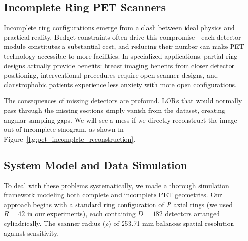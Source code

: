 \documentclass[12pt]{iopart}
\begin{document}
\subsection{Incomplete Ring PET Scanners}



Incomplete ring configurations emerge from a clash between ideal physics and practical reality. Budget constraints often drive this compromise—each detector module constitutes a substantial cost, and reducing their number can make PET technology accessible to more facilities. In specialized applications, partial ring designs actually provide benefits: breast imaging benefits from closer detector positioning, interventional procedures require open scanner designs, and claustrophobic patients experience less anxiety with more open configurations.





The consequences of missing detectors are profound. 
LORs that would normally pass through the missing sections simply vanish from the dataset, creating angular sampling gaps. We will see a mess if we directly reconstruct the image out of incomplete sinogram, as shown in Figure~\ref{fig:pet_incomplete_reconstruction}.

\subsection{System Model and Data Simulation}

To deal with these problems systematically, we made a thorough simulation framework modeling both complete and incomplete PET geometries. Our approach begins with a standard ring configuration of $R$ axial rings (we used $R=42$ in our experiments), each containing $D=182$ detectors arranged cylindrically. The scanner radius ($\rho$) of 253.71 mm balances spatial resolution against sensitivity.
\end{document}
